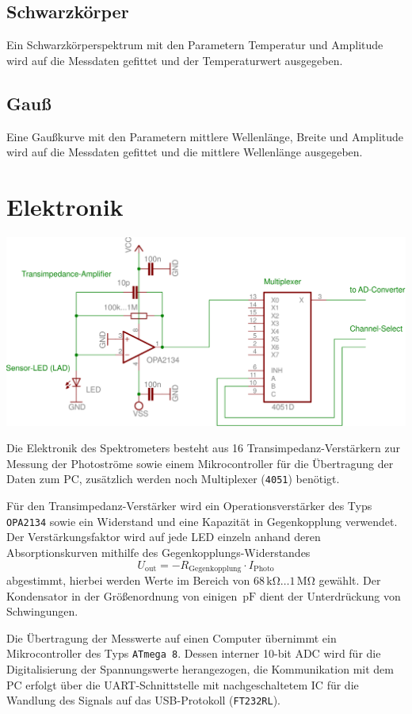 \documentclass[a4paper, 12pt]{scrartcl}
\newcommand{\unit}[1]{\ensuremath{\,\mathrm{#1}}}
\begin{document}
\subsection{Schwarzkörper}
Ein Schwarzkörperspektrum mit den Parametern Temperatur und Amplitude wird auf die Messdaten gefittet und der Temperaturwert ausgegeben.

\subsection{Gauß}
Eine Gaußkurve mit den Parametern mittlere Wellenlänge, Breite und Amplitude wird auf die Messdaten gefittet und die mittlere Wellenlänge ausgegeben.

\section{Elektronik}
\begin{center}
\includegraphics[width=\textwidth]{images/circuit.pdf}
\end{center}

Die Elektronik des Spektrometers besteht aus 16 Transimpedanz-Verstärkern zur Messung der Photoströme sowie einem Mikrocontroller für die Übertragung der Daten zum PC, zusätzlich werden noch Multiplexer (\texttt{4051}) benötigt.

Für den Transimpedanz-Verstärker wird ein Operationsverstärker des Typs \texttt{OPA2134} sowie ein Widerstand und eine Kapazität in Gegenkopplung verwendet.
Der Verstärkungsfaktor wird auf jede LED einzeln anhand deren Absorptionskurven mithilfe des Gegenkopplungs-Widerstandes
\[ U_{\text{out}} = - R_{\text{Gegenkopplung}} \cdot I_{\text{Photo}} \]
abgestimmt, hierbei werden Werte im Bereich von $68\unit{k\Omega} \ldots 1 \unit{M\Omega}$ gewählt. Der Kondensator in der Größenordnung von einigen $\unit{pF}$ dient der Unterdrückung von Schwingungen.

Die Übertragung der Messwerte auf einen Computer übernimmt ein Mikrocontroller des Typs \texttt{ATmega 8}. Dessen interner 10-bit ADC wird für die Digitalisierung der Spannungswerte herangezogen, die Kommunikation mit dem PC erfolgt über die UART-Schnittstelle mit nachgeschaltetem IC für die Wandlung des Signals auf das USB-Protokoll (\texttt{FT232RL}).
\end{document}
